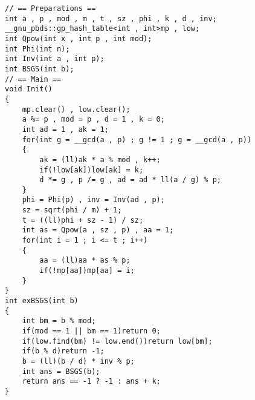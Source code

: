 \begin{verbatim}
// == Preparations ==
int a , p , mod , m , t , sz , phi , k , d , inv; 
__gnu_pbds::gp_hash_table<int , int>mp , low;
int Qpow(int x , int p , int mod);
int Phi(int n);
int Inv(int a , int p);
int BSGS(int b);
// == Main ==
void Init()
{
    mp.clear() , low.clear();
    a %= p , mod = p , d = 1 , k = 0; 
    int ad = 1 , ak = 1; 
    for(int g = __gcd(a , p) ; g != 1 ; g = __gcd(a , p))
    {
        ak = (ll)ak * a % mod , k++;
        if(!low[ak])low[ak] = k;
        d *= g , p /= g , ad = ad * ll(a / g) % p;
    }
    phi = Phi(p) , inv = Inv(ad , p);
    sz = sqrt(phi / m) + 1;
    t = ((ll)phi + sz - 1) / sz;
    int as = Qpow(a , sz , p) , aa = 1;
    for(int i = 1 ; i <= t ; i++)
    {
        aa = (ll)aa * as % p;
        if(!mp[aa])mp[aa] = i;
    }
}
int exBSGS(int b)
{
    int bm = b % mod;
    if(mod == 1 || bm == 1)return 0;    
    if(low.find(bm) != low.end())return low[bm];
    if(b % d)return -1;
    b = (ll)(b / d) * inv % p;
    int ans = BSGS(b);
    return ans == -1 ? -1 : ans + k;
}
\end{verbatim}